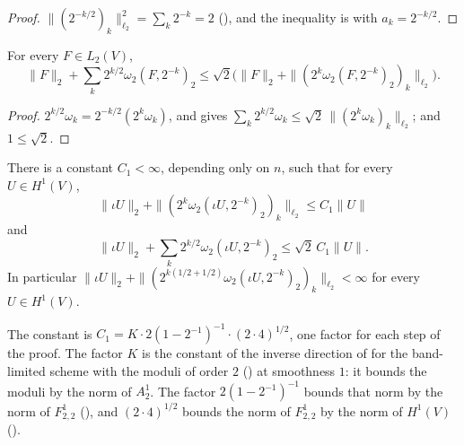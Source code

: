 \begin{proof}
\leanok
$\|(2^{-k/2})_k\|_{\ell_2}^2 = \sum_k 2^{-k} = 2$ (), and the inequality is
 with $a_k = 2^{-k/2}$.
\end{proof}

\begin{lemma}
\label{lem:besov-half-one}
\leanok
{}
For every $F \in L_2(V)$,
\[
  \|F\|_2 + \sum_k 2^{k/2} \omega_2(F, 2^{-k})_2
  \leq \sqrt 2 \bigl(\|F\|_2 + \|(2^k \omega_2(F, 2^{-k})_2)_k\|_{\ell_2}\bigr).
\]
\end{lemma}

\begin{proof}
\leanok
$2^{k/2} \omega_k = 2^{-k/2} (2^k \omega_k)$, and  gives
$\sum_k 2^{k/2} \omega_k \leq \sqrt 2 \, \|(2^k \omega_k)_k\|_{\ell_2}$; and $1 \leq \sqrt 2$.
\end{proof}

\begin{theorem}
\label{thm:sobolev-one-besov-constant}
\leanok
{}
There is a constant $C_1 < \infty$, depending only on $n$, such that for every $U \in H^1(V)$,
\[
  \|\iota U\|_2 + \|(2^k \omega_2(\iota U, 2^{-k})_2)_k\|_{\ell_2} \leq C_1 \|U\|
\]
and
\[
  \|\iota U\|_2 + \sum_k 2^{k/2} \omega_2(\iota U, 2^{-k})_2 \leq \sqrt 2 \, C_1 \|U\|.
\]
In particular
$\|\iota U\|_2 + \|(2^{k(1/2 + 1/2)} \omega_2(\iota U, 2^{-k})_2)_k\|_{\ell_2} < \infty$ for every
$U \in H^1(V)$.
\end{theorem}

The constant is $C_1 = K \cdot 2 (1 - 2^{-1})^{-1} \cdot (2 \cdot 4)^{1/2}$, one factor for each
step of the proof. The factor $K$ is the constant of the inverse direction of
 for the band-limited scheme with the moduli of order $2$
() at smoothness $1$: it bounds the moduli by the norm of $A^1_2$. The factor
$2 (1 - 2^{-1})^{-1}$ bounds that norm by the norm of $F^1_{2,2}$
(), and $(2 \cdot 4)^{1/2}$ bounds the norm of $F^1_{2,2}$ by the norm
of $H^1(V)$ ().

